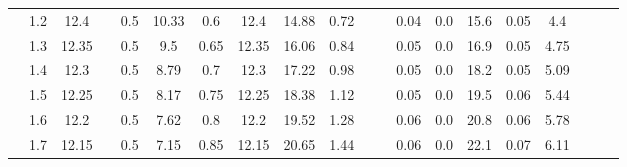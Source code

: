 \documentclass[a4paper,12pt]{article}
\begin{document}
\begin{table}[htbp]
\begin{tabular}{|c|c|c|c|c|c|c|c|c|c|c|c|c|c|c|c|c|c|c|c|}
			& 1.2        & 12.4       &                       & 0.5           & 10.33         & 0.6           & 12.4          & 14.88         & 0.72          &                        &                         & 0.04               & 0.0                & 15.6       & 0.05            & 4.4                 &                       &                       &                       \\ \cline{2-3} \cline{5-10} \cline{13-17}
			& 1.3        & 12.35      &                       & 0.5           & 9.5           & 0.65          & 12.35         & 16.06         & 0.84          &                        &                         & 0.05               & 0.0                & 16.9       & 0.05            & 4.75                &                       &                       &                       \\ \cline{2-3} \cline{5-10} \cline{13-17}
			& 1.4        & 12.3       &                       & 0.5           & 8.79          & 0.7           & 12.3          & 17.22         & 0.98          &                        &                         & 0.05               & 0.0                & 18.2       & 0.05            & 5.09                &                       &                       &                       \\ \cline{2-3} \cline{5-10} \cline{13-17}
			& 1.5        & 12.25      &                       & 0.5           & 8.17          & 0.75          & 12.25         & 18.38         & 1.12          &                        &                         & 0.05               & 0.0                & 19.5       & 0.06            & 5.44                &                       &                       &                       \\ \cline{2-3} \cline{5-10} \cline{13-17}
			& 1.6        & 12.2       &                       & 0.5           & 7.62          & 0.8           & 12.2          & 19.52         & 1.28          &                        &                         & 0.06               & 0.0                & 20.8       & 0.06            & 5.78                &                       &                       &                       \\ \cline{2-3} \cline{5-10} \cline{13-17}
			& 1.7        & 12.15      &                       & 0.5           & 7.15          & 0.85          & 12.15         & 20.65         & 1.44          &                        &                         & 0.06               & 0.0                & 22.1       & 0.07            & 6.11                &                       &                       &                       \\ \cline{2-3} \cline{5-10} \cline{13-17}

\end{tabular}
\end{table}
\end{document}
